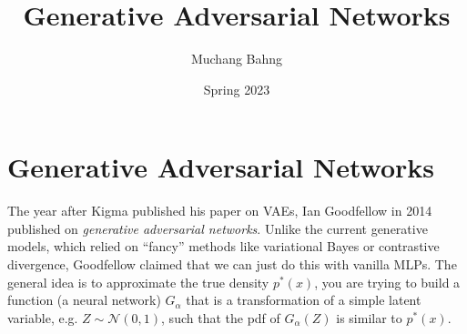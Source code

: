 \documentclass{article}
\begin{document}

\title{Generative Adversarial Networks} 
\author{Muchang Bahng}
\date{Spring 2023}

\maketitle
\tableofcontents
\pagebreak 




\section{Generative Adversarial Networks} 

  The year after Kigma published his paper on VAEs, Ian Goodfellow in 2014 published \cite{gans} on \textit{generative adversarial networks}. Unlike the current generative models, which relied on ``fancy'' methods like variational Bayes or contrastive divergence, Goodfellow claimed that we can just do this with vanilla MLPs. The general idea is to approximate the true density $p^\ast (x)$, you are trying to build a function (a neural network) $G_\alpha$ that is a transformation of a simple latent variable, e.g. $Z \sim \mathcal{N}(0, 1)$, such that the pdf of $G_\alpha (Z)$ is similar to $p^\ast (x)$. 
\end{document}
